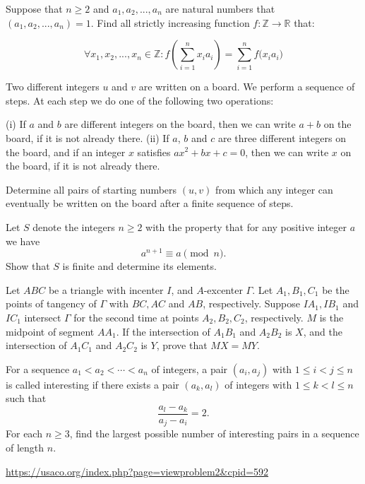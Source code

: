 \documentclass[11pt]{scrartcl}
\begin{document}
\begin{problem}
Suppose that $n\ge2$ and $a_1,a_2,...,a_n$ are natural numbers that $ (a_1,a_2,...,a_n)=1$. Find all strictly increasing function $f: \mathbb{Z}  \to \mathbb{R} $ that:

$$ \forall  x_1,x_2,...,x_n \in  \mathbb{Z} :       f(\sum_{i=1}^{n} {x_ia_i}) = \sum_{i=1}^{n} {f(x_ia_i})$$
\end{problem}
\begin{problem}[EGMO 2024/1]
Two different integers $u$ and $v$ are written on a board. We perform a sequence of steps. At each step we do one of the following two operations:

(i) If $a$ and $b$ are different integers on the board, then we can write $a + b$ on the board, if it is not
already there.
(ii) If $a$, $b$ and $c$ are three different integers on the board, and if an integer $x$ satisfies $ax^2 +bx+c = 0$,
then we can write $x$ on the board, if it is not already there.

Determine all pairs of starting numbers $(u, v)$ from which any integer can eventually be written on the board after a finite sequence of steps.
\end{problem}
\begin{problem}
Let $S$ denote the integers $n\ge 2$ with the property that for any positive integer $a$ we have$$a^{n+1} \equiv a \pmod n.$$Show that $S$ is finite and determine its elements.
\end{problem}
\begin{problem}[PAGMO 2021/6]
   Let $ABC$ be a triangle with incenter $I$, and $A$-excenter $\Gamma$. Let $A_1,B_1,C_1$ be the points of tangency of $\Gamma$ with $BC,AC$ and $AB$, respectively. Suppose $IA_1, IB_1$ and $IC_1$ intersect $\Gamma$ for the second time at points $A_2,B_2,C_2$, respectively. $M$ is the midpoint of segment $AA_1$. If the intersection of $A_1B_1$ and $A_2B_2$ is $X$, and the intersection of $A_1C_1$ and $A_2C_2$ is $Y$, prove that $MX=MY$.
\end{problem}
\begin{problem}[EGMO 2024/4]
	For a sequence $a_1<a_2<\cdots<a_n$ of integers, a pair $(a_i,a_j)$ with $1\leq i<j\leq n$ is called interesting if there exists a pair $(a_k,a_l)$ of integers with $1\leq k<l\leq n$ such that$$\frac{a_l-a_k}{a_j-a_i}=2.$$For each $n\geq 3$, find the largest possible number of interesting pairs in a sequence of length $n$.
\end{problem}
\begin{problem}
\url{https://usaco.org/index.php?page=viewproblem2&cpid=592}
\end{problem}
\end{document}
